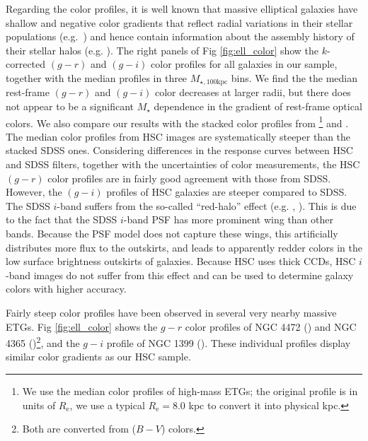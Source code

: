 \documentclass[a4paper,fleqn,usenatbib]{mnras}
\def\mstar{{$M_{\star}$}}
\def\mtot{{$M_{\star,100\mathrm{kpc}}$}}
\begin{document}
    Regarding the color profiles, it is well known that massive elliptical galaxies 
    have shallow and negative color gradients that reflect radial variations in their  
    stellar populations (e.g.\ \citealt{Carollo1993, LaBarbera2012}) and hence contain
    information about the assembly history of their stellar halos (e.g. 
    \citealt{Hirschmann2015}). 
    The right panels of Fig \ref{fig:ell_color} show the $k$-corrected $(g-r)$ and 
    $(g-i)$ color profiles for all galaxies in our sample, together with the median 
    profiles in three \mtot{} bins. 
    We find the the median rest-frame $(g-r)$ and $(g-i)$ color decreases at 
    larger radii, but there does not appear to be a significant \mstar{} dependence 
    in the gradient of rest-frame optical colors. 
    We also compare our results with the stacked color profiles from  
    \citealt{LaBarbera2010}\footnote{We use the median color profiles of high-mass 
    ETGs; the original profile is in units of $R_{\mathrm{e}}$, we use a typical 
    $R_{\mathrm{e}}=8.0$ kpc to convert it into physical kpc.} and 
    \citealt{DSouza2014}.
    The median color profiles from HSC images are systematically steeper than the 
    stacked SDSS ones. 
    Considering differences in the response curves between HSC and SDSS filters, 
    together with the uncertainties of color measurements, the HSC $(g-r)$ color 
    profiles are in fairly good agreement with those from SDSS. 
    However, the $(g-i)$ profiles of HSC galaxies are steeper compared to SDSS. 
    The SDSS $i$-band suffers from the so-called ``red-halo'' effect
    (e.g. \citealt{Wu2005}, \citealt{Tal2011}).  
    This is due to the fact that the SDSS $i$-band PSF has more prominent wing 
    than other bands. 
    Because the PSF model does not capture these wings, this artificially distributes 
    more flux to the outskirts, and leads to apparently redder colors in the low 
    surface brightness outskirts of galaxies. 
    Because HSC uses thick CCDs, HSC $i$-band images do not suffer from this effect 
    and can be used to determine galaxy colors with higher accuracy. 
        
    
    Fairly steep color profiles have been observed in several very nearby massive 
    ETGs.  
    Fig \ref{fig:ell_color} shows the $g-r$ color profiles of NGC 4472 
    (\citealt{Mihos2013}) and NGC 4365 (\citealt{Mihos2017})\footnote{
    Both are converted from ($B-V$) colors.}, and the $g-i$ profile of NGC 1399 
    (\citealt{Iodice2016}). 
    These individual profiles display similar color gradients as our HSC sample.   
    
\end{document}
